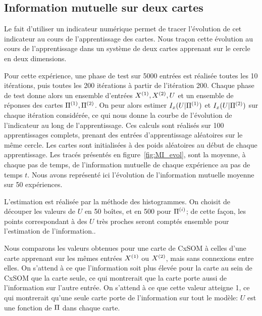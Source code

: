 
\subsection{Information mutuelle sur deux cartes}

Le fait d'utiliser un indicateur numérique permet de tracer l'évolution de cet indicateur au cours de l'apprentissage des cartes. Nous traçon cette évolution au cours de l'apprentissage dans un système de deux cartes apprenant sur le cercle en deux dimensions.

Pour cette expérience, une phase de test sur 5000 entrées est réalisée toutes les 10 itérations, puis toutes les 200 itérations à partir de l'itération 200. Chaque phase de test donne alors un ensemble d'entrées $X^{({1})}, X^{({2})}, U$ et un ensemble de réponses des cartes $\Pi^{({1})}, \Pi^{({2})}$. On peur alors estimer $I_x(U|\Pi^{({1})})$ et $I_x(U|\Pi^{({2})})$ sur chaque itération considérée, ce qui nous donne la courbe de l'évolution de l'indicateur au long de l'apprentissage. 
Ces calculs sont réalisés sur 100 apprentissages complets, prenant des entrées d'apprentissage aléatoires sur le même cercle. Les cartes sont initialisées à des poids aléatoires au début de chaque apprentissage. 
Les tracés présentés en figure~\ref{fig:MI_evol}, sont la moyenne, à chaque pas de temps, de l'information mutuelle de chaque expérience au pas de temps $t$. Nous avons représenté ici l'évolution de l'information mutuelle moyenne sur 50 expériences.

L'estimation est réalisée par la méthode des histogrammes. On choisit de découper les valeurs de $U$ en 50 boîtes, et en 500 pour $\Pi^{({i})}$; de cette façon, les points correspondant à des $U$ très proches seront comptés ensemble pour l'estimation de l'information..

Nous comparons les valeurs obtenues pour une carte de CxSOM à celles d'une carte apprenant sur les mêmes entrées $X^{({1})}$ ou $X^{({2})}$, mais sans connexions entre elles. On s'attend à ce que l'information soit plus élevée pour la carte au sein de CxSOM que la carte seule, ce qui montrerait que la carte porte aussi de l'information sur l'autre entrée. On s'attend à ce que cette valeur atteigne 1, ce qui montrerait qu'une seule carte porte de l'information sur tout le modèle: $U$ est une fonction de $\Pi$ dans chaque carte.

